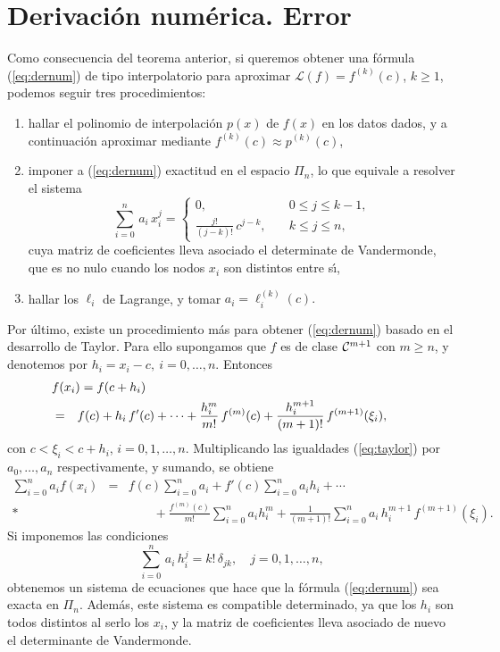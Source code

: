 \section{Derivaci\'on num\'erica. Error}

Como consecuencia del teorema anterior, si queremos obtener una f\'ormula (\ref{eq:dernum}) de tipo
interpolatorio para aproximar $\mathcal{L}(f)= f^{(k)}(c)$, $k\ge 1$, podemos seguir tres
procedimientos:
\begin{enumerate}
\item hallar el polinomio de interpolaci\'on $p(x)$ de $f(x)$ en los datos dados, y a continuaci\'on aproximar mediante
      $f^{(k)}(c) \approx p^{(k)}(c)$,
      
\item imponer a (\ref{eq:dernum}) exactitud en el espacio $\Pi_n$,
      lo que equivale a resolver el sistema
      $$
      \sum_{i=0}^n \,a_i \,x_i^j= 
      \begin{cases}
         0, & \quad 0 \le j \le k-1,         \\
\frac{\displaystyle{j!}}{\displaystyle{(j-k)!}}\,c^{j-k}, &
        \quad  k \le j \le n,
      \end{cases}
      $$
cuya matriz de coeficientes lleva asociado el determinate de Vandermonde, que es no nulo cuando los nodos $x_i$ son distintos entre s\'{\i},
\item hallar los $\ell_i$ de Lagrange, y tomar $a_i = \ell_i^{(k)}(c).$
\end{enumerate}

Por \'ultimo, existe un procedimiento m\'as para obtener (\ref{eq:dernum})
basado en el desarrollo de Taylor. Para ello supongamos que $f$ es de clase
${\cal C}^{m+1}$ con $m \ge n$, y denotemos por $h_i = x_i - c,\ i=0,\ldots,n$.
Entonces
\begin{eqnarray}
  \lefteqn{f(x_i)  =  f(c+h_i)}            \nonumber         \\*
  & = & f(c) + h_i\,f'(c) +\cdots +\frac{h_i^m}{m!}\,f^{(m)}(c)
              +\frac{h_i^{m+1}}{(m+1)!}\,f^{(m+1)}(\xi_i), \qquad \label{eq:taylor}   
\end{eqnarray}
con $c < \xi_i < c+h_i$, $i=0,1, \ldots,n$. Multiplicando las igualdades (\ref{eq:taylor}) 
por $a_0,\ldots,a_n$
respectivamente, y su\-man\-do, se ob\-tie\-ne
\begin{eqnarray*}
 \sum_{i=0}^n a_i f(x_i) &=& f(c)\sum_{i=0}^n a_i
                                  + f'(c) \sum_{i=0}^n a_i h_i +\cdots \\*
 && \qquad + \frac{f^{(m)}(c)}{m!} \sum_{i=0}^n a_i h_i^m
        + \frac{1}{(m+1)!}\sum_{i=0}^n a_i \,h_i^{m+1} \,f^{(m+1)}(\xi_i).
\end{eqnarray*}
Si imponemos las condiciones
$$\sum_{i=0}^n \, a_i\, h_i^j = k!\,\delta_{jk},\quad j=0,1,\ldots,n,
$$
obtenemos un sistema de ecuaciones que hace que la f\'ormula (\ref{eq:dernum}) sea exacta en $\Pi_n$. 
Adem\'as, este sistema es compatible determinado, ya que los $h_i$ son todos
distintos al serlo los $x_i$, y la matriz de coeficientes
lleva asociado de nuevo el determinante de Vandermonde. 

